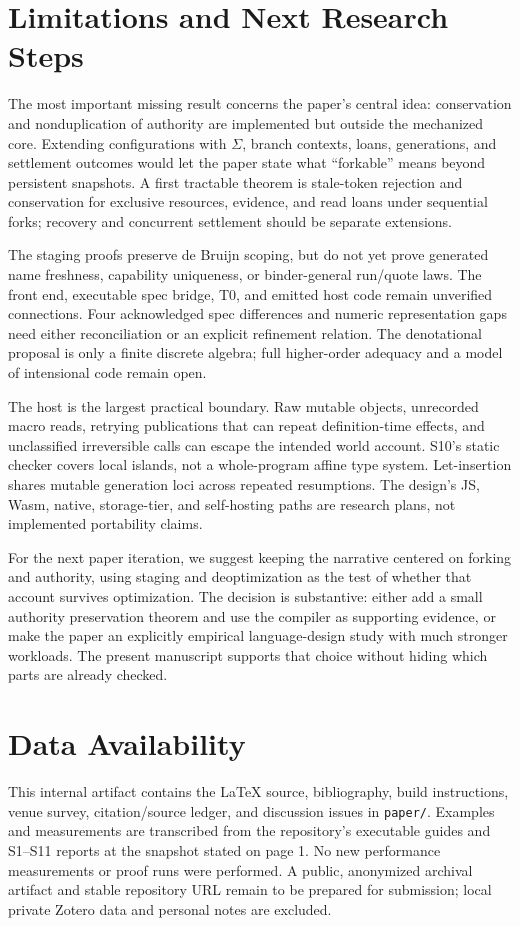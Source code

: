 \documentclass[acmsmall,screen,review,nonacm]{acmart}
\newcommand{\src}[1]{{\normalfont\nolinkurl{#1}}}
\begin{document}
\section{Limitations and Next Research Steps}
The most important missing result concerns the paper's central idea:
conservation and nonduplication of authority are implemented but outside the
mechanized core. Extending configurations with $\Sigma$, branch contexts,
loans, generations, and settlement outcomes would let the paper state what
``forkable'' means beyond persistent snapshots. A first tractable theorem is
stale-token rejection and conservation for exclusive resources, evidence,
and read loans under sequential forks; recovery and concurrent settlement
should be separate extensions.

The staging proofs preserve de Bruijn scoping, but do not yet prove generated
name freshness, capability uniqueness, or binder-general run/quote laws.
The front end, executable spec bridge, T0, and emitted host code remain
unverified connections. Four acknowledged spec differences and numeric
representation gaps need either reconciliation or an explicit refinement
relation. The denotational proposal is only a finite discrete algebra; full
higher-order adequacy and a model of intensional code remain open.

The host is the largest practical boundary. Raw mutable objects, unrecorded
macro reads, retrying publications that can repeat definition-time effects,
and unclassified irreversible calls can escape the intended world account.
S10's static checker covers local islands, not a whole-program affine type
system. Let-insertion shares mutable generation loci across repeated resumptions.
The design's JS, Wasm, native, storage-tier, and self-hosting paths are research
plans, not implemented portability claims.

For the next paper iteration, we suggest keeping the narrative centered on
forking and authority, using staging and deoptimization as the test of whether
that account survives optimization. The decision is substantive: either add
a small authority preservation theorem and use the compiler as supporting
evidence, or make the paper an explicitly empirical language-design study
with much stronger workloads. The present manuscript supports that choice
without hiding which parts are already checked.

\section*{Data Availability}
This internal artifact contains the LaTeX source, bibliography, build
instructions, venue survey, citation/source ledger, and discussion issues in
\src{paper/}. Examples and measurements are transcribed from the repository's
executable guides and S1--S11 reports at the snapshot stated on page 1.
No new performance measurements or proof runs were performed. A public,
anonymized archival artifact and stable repository URL remain to be prepared
for submission; local private Zotero data and personal notes are excluded.
\end{document}
